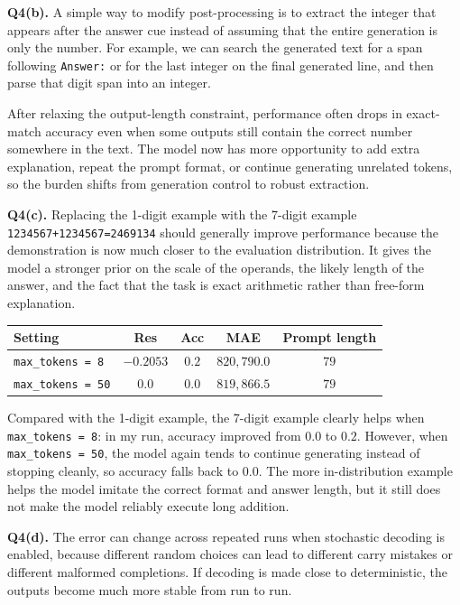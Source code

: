 \documentclass[11pt]{article}
\begin{document}
\textbf{Q4(b).} A simple way to modify post-processing is to extract the integer that appears after the answer cue instead of assuming that the entire generation is only the number. For example, we can search the generated text for a span following \texttt{Answer:} or for the last integer on the final generated line, and then parse that digit span into an integer.

After relaxing the output-length constraint, performance often drops in exact-match accuracy even when some outputs still contain the correct number somewhere in the text. The model now has more opportunity to add extra explanation, repeat the prompt format, or continue generating unrelated tokens, so the burden shifts from generation control to robust extraction.

\textbf{Q4(c).} Replacing the 1-digit example with the 7-digit example \texttt{1234567+1234567=2469134} should generally improve performance because the demonstration is now much closer to the evaluation distribution. It gives the model a stronger prior on the scale of the operands, the likely length of the answer, and the fact that the task is exact arithmetic rather than free-form explanation.

\begin{center}
\small
\begin{tabular}{>{\raggedright\arraybackslash}p{2.8cm}cccc}
\toprule
Setting & Res & Acc & MAE & Prompt length \\
\midrule
\texttt{max\_tokens = 8} & \(-0.2053\) & \(0.2\) & \(820{,}790.0\) & \(79\) \\
\texttt{max\_tokens = 50} & \(0.0\) & \(0.0\) & \(819{,}866.5\) & \(79\) \\
\bottomrule
\end{tabular}
\end{center}

Compared with the 1-digit example, the 7-digit example clearly helps when \texttt{max\_tokens = 8}: in my run, accuracy improved from \(0.0\) to \(0.2\). However, when \texttt{max\_tokens = 50}, the model again tends to continue generating instead of stopping cleanly, so accuracy falls back to \(0.0\). The more in-distribution example helps the model imitate the correct format and answer length, but it still does not make the model reliably execute long addition.

\textbf{Q4(d).} The error can change across repeated runs when stochastic decoding is enabled, because different random choices can lead to different carry mistakes or different malformed completions. If decoding is made close to deterministic, the outputs become much more stable from run to run.
\end{document}
